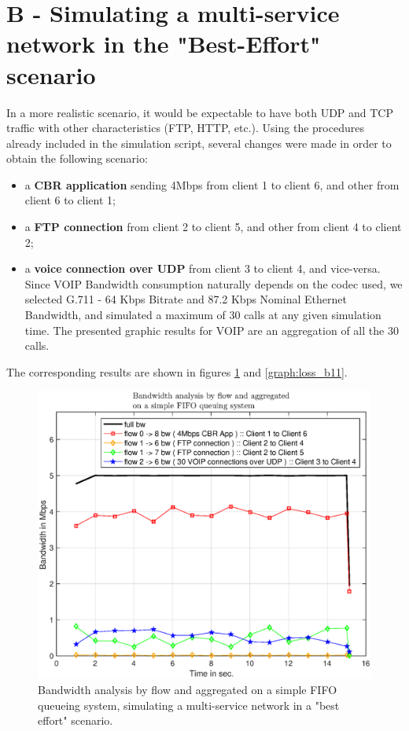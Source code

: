 \documentclass[conference,compsoc]{IEEEtran}
\begin{document}
     \section{B - Simulating a multi-service network in  the "Best-Effort" scenario}
\label{multiservice}


     In a more realistic scenario, it would be expectable to have both UDP and TCP traffic with other characteristics (FTP, HTTP, etc.).
     Using the procedures already included in the simulation script, several changes were made in order to obtain the
     following scenario:
     \begin{itemize}
     \item a \textbf{CBR application} sending 4Mbps from client 1 to client 6, and other from client 6 to client 1;
     \item  a \textbf{FTP connection} from client 2 to client 5, and other from client 4 to client 2;
     \item  a \textbf{voice connection over UDP} from client 3 to client 4, and vice-versa. Since VOIP Bandwidth consumption naturally depends on the codec used, we selected G.711 - 64 Kbps Bitrate and 87.2 Kbps Nominal Ethernet Bandwidth, and simulated a maximum of 30 calls at any given simulation time. The presented graphic results for VOIP are an aggregation of all the 30 calls. 
     \end{itemize}
     The corresponding results are shown in figures \ref{graph:bw_b1} and \ref{graph:loss_b11}.

     \begin{figure}[H]
     \centering
     \includegraphics[width=1\columnwidth]{EPS/B/bw_b1.eps}
     \caption{Bandwidth analysis by flow and aggregated on a simple FIFO queueing system, simulating a multi-service network in a "best effort" scenario.}
     \label{graph:bw_b1}
     \end{figure}
\end{document}
